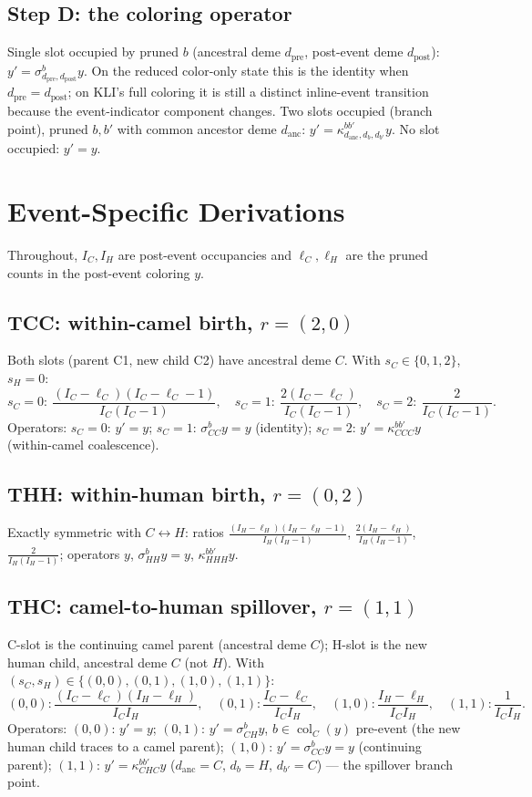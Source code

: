\documentclass[11pt]{article}
\newcommand{\col}{\operatorname{col}}
\theoremstyle{plain}
\begin{document}
\subsection{Step D: the coloring operator}
Single slot occupied by pruned $b$ (ancestral deme $d_{\mathrm{pre}}$, post-event deme
$d_{\mathrm{post}}$): $y'=\sigma^b_{d_{\mathrm{pre}},d_{\mathrm{post}}}y$. On the reduced
color-only state this is the identity when $d_{\mathrm{pre}}=d_{\mathrm{post}}$; on KLI's full
coloring it is still a distinct inline-event transition because the event-indicator component
changes. Two slots occupied (branch point), pruned $b,b'$ with common
ancestor deme $d_{\mathrm{anc}}$: $y'=\kappa^{bb'}_{d_{\mathrm{anc}},d_b,d_{b'}}y$. No slot occupied:
$y'=y$.

\section{Event-Specific Derivations}
Throughout, $I_C,I_H$ are post-event occupancies and $\ell_C,\ell_H$ are the pruned counts in the
post-event coloring $y$.

\subsection{TCC: within-camel birth, $r=(2,0)$}
Both slots (parent C1, new child C2) have ancestral deme $C$. With $s_C\in\{0,1,2\}$, $s_H=0$:
\[
s_C{=}0:\ \frac{(I_C-\ell_C)(I_C-\ell_C-1)}{I_C(I_C-1)},\quad
s_C{=}1:\ \frac{2(I_C-\ell_C)}{I_C(I_C-1)},\quad
s_C{=}2:\ \frac{2}{I_C(I_C-1)}.
\]
Operators: $s_C{=}0$: $y'=y$; $s_C{=}1$: $\sigma^b_{CC}y=y$ (identity); $s_C{=}2$:
$y'=\kappa^{bb'}_{CCC}y$ (within-camel coalescence).

\subsection{THH: within-human birth, $r=(0,2)$}
Exactly symmetric with $C\leftrightarrow H$: ratios
$\frac{(I_H-\ell_H)(I_H-\ell_H-1)}{I_H(I_H-1)}$, $\frac{2(I_H-\ell_H)}{I_H(I_H-1)}$,
$\frac{2}{I_H(I_H-1)}$; operators $y$, $\sigma^b_{HH}y=y$, $\kappa^{bb'}_{HHH}y$.

\subsection{THC: camel-to-human spillover, $r=(1,1)$}
C-slot is the continuing camel parent (ancestral deme $C$); H-slot is the new human child, ancestral
deme $C$ (not $H$). With $(s_C,s_H)\in\{(0,0),(0,1),(1,0),(1,1)\}$:
\[
(0,0):\frac{(I_C-\ell_C)(I_H-\ell_H)}{I_CI_H},\quad
(0,1):\frac{I_C-\ell_C}{I_CI_H},\quad
(1,0):\frac{I_H-\ell_H}{I_CI_H},\quad
(1,1):\frac{1}{I_CI_H}.
\]
Operators: $(0,0)$: $y'=y$; $(0,1)$: $y'=\sigma^b_{CH}y$, $b\in\col_C(y)$ pre-event (the new human
child traces to a camel parent); $(1,0)$: $y'=\sigma^b_{CC}y=y$ (continuing parent); $(1,1)$:
$y'=\kappa^{bb'}_{CHC}y$ ($d_{\mathrm{anc}}=C$, $d_b=H$, $d_{b'}=C$) --- the spillover branch point.
\end{document}
